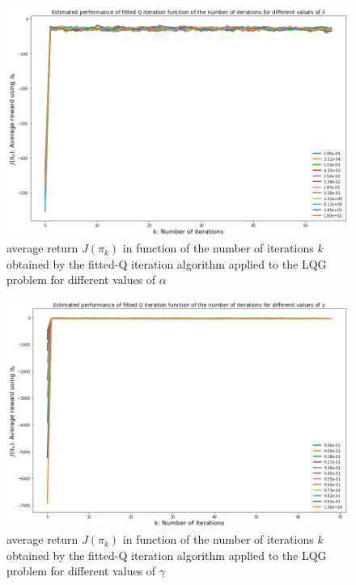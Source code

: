 \documentclass[11pt]{article}
\numberwithin{figure}{section} %
\begin{document}
\begin{figure}[H]
		\centering
		\includegraphics[width=0.9\linewidth]{images/fqi_alpha}
		\caption{average return $J(\pi_k)$ in function of the number of iterations $k$ obtained by the fitted-Q iteration algorithm applied to the LQG problem for different values of $\alpha$}
		\label{fig:fqi_alpha}
\end{figure}

\begin{figure}[H]
		\centering
		\includegraphics[width=0.9\linewidth]{images/fqi_gamma}
		\caption{average return $J(\pi_k)$ in function of the number of iterations $k$ obtained by the fitted-Q iteration algorithm applied to the LQG problem for different values of $\gamma$}
		\label{fig:fqi_gamma}
\end{figure}
\end{document}
